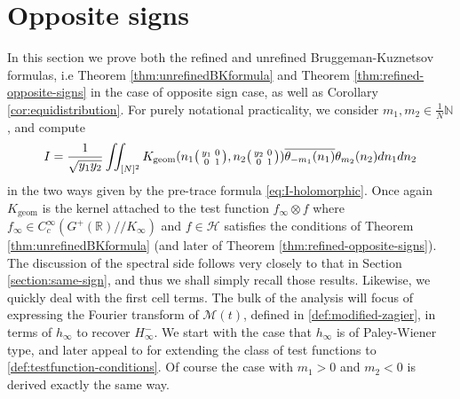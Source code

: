 \documentclass{article}
\numberwithin{equation}{section}
\begin{document}
\section{Opposite signs}\label{section:opposite-signs}
In this section we prove both the refined and unrefined Bruggeman-Kuznetsov formulas, i.e Theorem \ref{thm:unrefinedBKformula} and Theorem \ref{thm:refined-opposite-signs} in the case of opposite sign case, as well as Corollary \ref{cor:equidistribution}. For purely notational practicality, we consider $m_1, m_2 \in \tfrac{1}{N}\mathbb{N}$, and compute 
\begin{equation}
    I = \frac{1}{\sqrt{y_1y_2}}\iint_{[N]^2}K_\text{geom}(n_1\begin{psmallmatrix}
        y_1 & 0 \\ 0 & 1
    \end{psmallmatrix},n_2\begin{psmallmatrix}
        y_2 & 0 \\ 0 & 1
    \end{psmallmatrix})\overline{\theta_{-m_1}(n_1)}\theta_{m_2}(n_2) dn_1dn_2
\end{equation}
in the two ways given by the pre-trace formula \eqref{eq:I-holomorphic}. Once again $K_{\operatorname{geom}}$ is the kernel attached to the test function $f_\infty\otimes f$ where $f_\infty \in C_c^\infty(G^+(\mathbb{R})//K_\infty)$ and $f \in \mathcal{H}$ satisfies the conditions of Theorem \ref{thm:unrefinedBKformula} (and later of Theorem \ref{thm:refined-opposite-signs}). The discussion of the spectral side follows very closely to that in Section \ref{section:same-sign}, and thus we shall simply recall those results. Likewise, we quickly deal with the first cell terms. The bulk of the analysis will focus of expressing the Fourier transform of $\mathcal{M}(t)$, defined in \eqref{def:modified-zagier}, in terms of $h_\infty$ to recover $H_\infty^-$. We start with the case that $h_\infty$ is of Paley-Wiener type, and later appeal to \cite[\S 8]{KL-kuznetsov} for extending the class of test functions to \eqref{def:testfunction-conditions}. Of course the case with $m_1>0$ and $m_2<0$ is derived exactly the same way.
\end{document}
